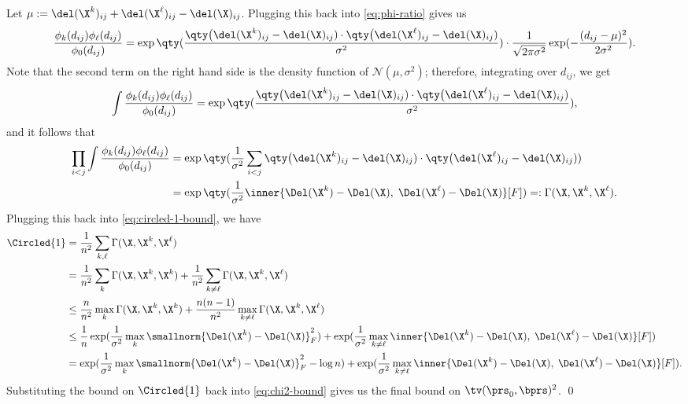 \documentclass[10pt]{article}
\begin{document}
Let $\mu := \del(\X^k)_{ij} + \del(\X^\ell)_{ij} - \del(\X)_{ij}$. Plugging this back into \cref{eq:phi-ratio} gives us
\begin{align}
    \frac{\phi_k(d_{ij})\phi_\ell(d_{ij})}{\phi_0(d_{ij})} = \exp\qty(\frac{\qty\big(\del(\X^k)_{ij} - \del(\X)_{ij})\cdot\qty\big(\del(\X^\ell)_{ij} - \del(\X)_{ij})}{\sigma^2}) \cdot \frac{1}{\sqrt{2\pi\sigma^2}}\exp(-\frac{(d_{ij} - \mu)^2}{2\sigma^2}).
\end{align}
Note that the second term on the right hand side is the density function of $\mathcal{N}(\mu, \sigma^2)$; therefore, integrating over $d_{ij}$, we get
\begin{align}
    \int \frac{\phi_k(d_{ij})\phi_\ell(d_{ij})}{\phi_0(d_{ij})} = \exp\qty(\frac{\qty\big(\del(\X^k)_{ij} - \del(\X)_{ij})\cdot\qty\big(\del(\X^\ell)_{ij} - \del(\X)_{ij})}{\sigma^2}),
\end{align}
and it follows that
\begin{align}
    \prod_{i < j}\int \frac{\phi_k(d_{ij})\phi_\ell(d_{ij})}{\phi_0(d_{ij})} 
    &= \exp\qty(\frac{1}{\sigma^2}\sum_{i < j}{\qty\big(\del(\X^k)_{ij} - \del(\X)_{ij})\cdot\qty\big(\del(\X^\ell)_{ij} - \del(\X)_{ij})})\\ 
    &= \exp\qty(\frac{1}{\sigma^2}{\inner{\Del(\X^k) - \Del(\X),\; \Del(\X^\ell) - \Del(\X)}[F]}) =: \Gamma(\X, \X^k, \X^\ell).
\end{align}
Plugging this back into \cref{eq:circled-1-bound}, we have
\begin{align}
    \Circled{1} 
    &= \frac{1}{n^2}\sum_{k, \ell}\Gamma(\X, \X^k, \X^\ell)\\
    &= \frac{1}{n^2}\sum_{k}\Gamma(\X, \X^k, \X^k) + \frac{1}{n^2}\sum_{k \neq \ell}\Gamma(\X, \X^k, \X^\ell)\\
    &\le \frac{n}{n^2}\max_{k}\Gamma(\X, \X^k, \X^k) + \frac{n(n-1)}{n^2}\max_{k \neq \ell}\Gamma(\X, \X^k, \X^\ell)\\
    &\le \frac{1}{n}\exp(\frac{1}{\sigma^2}\max_{k}\smallnorm{\Del(\X^k) - \Del(\X)}^2_F) + \exp(\frac{1}{\sigma^2}\max_{k \neq \ell} {\inner{\Del(\X^k) - \Del(\X),\; \Del(\X^\ell) - \Del(\X)}[F]})\\
    &= \exp(\frac{1}{\sigma^2}\max_{k}\smallnorm{\Del(\X^k) - \Del(\X)}^2_F - \log{n}) + \exp(\frac{1}{\sigma^2}\max_{k \neq \ell} {\inner{\Del(\X^k) - \Del(\X),\; \Del(\X^\ell) - \Del(\X)}[F]}).
\end{align}
Substituting the bound on $\Circled{1}$ back into \cref{eq:chi2-bound} gives us the final bound on $\tv(\prs_0, \bprs)^2$. \qed
\end{document}
